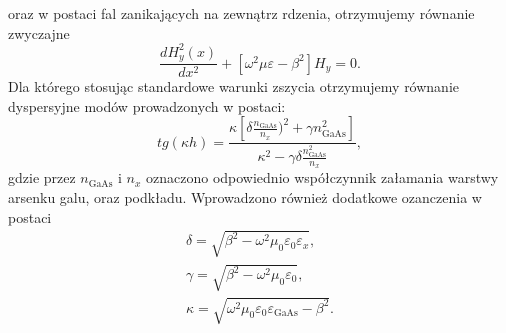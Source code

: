 oraz w postaci fal zanikających na zewnątrz rdzenia, otrzymujemy równanie zwyczajne
\begin{equation}
	\frac{d H_y^2(x)}{dx^2} + [ \omega^2 \mu \varepsilon - \beta^2 ] H_y = 0.
\end{equation}
Dla którego stosując standardowe warunki zszycia otrzymujemy równanie dyspersyjne modów prowadzonych w postaci\cite{petykiewicz1989podstawy}:
\begin{equation}
tg( \kappa h)=\frac{\kappa [ \delta \frac{n_{\textrm{GaAs}}}{n_x})^2 + \gamma n_{\textrm{GaAs}}^2 ]}{\kappa^2 - \gamma \delta \frac{n_{\textrm{GaAs}}^2}{n_x }},
\label{eq:tm-disp}
\end{equation}
gdzie przez $n_{\textrm{GaAs}}$ i $n_x$ oznaczono odpowiednio współczynnik załamania warstwy arsenku galu, oraz podkładu. Wprowadzono również dodatkowe ozanczenia w postaci
\begin{equation}
	\begin{gathered}
		\delta=\sqrt{\beta^2-\omega^2 \mu_0 \varepsilon_0 \varepsilon_x},\\
		\gamma=\sqrt{\beta^2-\omega^2 \mu_0 \varepsilon_0},\\
		\kappa=\sqrt{\omega^2 \mu_0 \varepsilon_0 \varepsilon_{\textrm{GaAs}} - \beta^2}.
	\end{gathered}
\end{equation}

